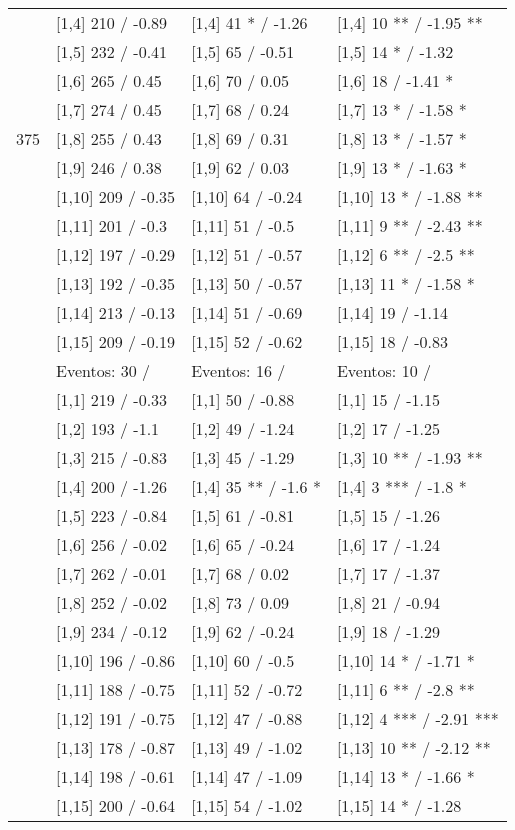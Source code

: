 \begin{table}
\begin{tabular}[t]{llll}
\addlinespace
 & {}[1,4] 210  / -0.89 & {}[1,4] 41 * / -1.26 & {}[1,4] 10 ** / -1.95 **\\
 & {}[1,5] 232  / -0.41 & {}[1,5] 65  / -0.51 & {}[1,5] 14 * / -1.32\\
 & {}[1,6] 265  / 0.45 & {}[1,6] 70  / 0.05 & {}[1,6] 18  / -1.41 *\\
 & {}[1,7] 274  / 0.45 & {}[1,7] 68  / 0.24 & {}[1,7] 13 * / -1.58 *\\
375 & {}[1,8] 255  / 0.43 & {}[1,8] 69  / 0.31 & {}[1,8] 13 * / -1.57 *\\
\addlinespace
 & {}[1,9] 246  / 0.38 & {}[1,9] 62  / 0.03 & {}[1,9] 13 * / -1.63 *\\
 & {}[1,10] 209  / -0.35 & {}[1,10] 64  / -0.24 & {}[1,10] 13 * / -1.88 **\\
 & {}[1,11] 201  / -0.3 & {}[1,11] 51  / -0.5 & {}[1,11] 9 ** / -2.43 **\\
 & {}[1,12] 197  / -0.29 & {}[1,12] 51  / -0.57 & {}[1,12] 6 ** / -2.5 **\\
 & {}[1,13] 192  / -0.35 & {}[1,13] 50  / -0.57 & {}[1,13] 11 * / -1.58 *\\
\addlinespace
 & {}[1,14] 213  / -0.13 & {}[1,14] 51  / -0.69 & {}[1,14] 19  / -1.14\\
 & {}[1,15] 209  / -0.19 & {}[1,15] 52  / -0.62 & {}[1,15] 18  / -0.83\\
 & Eventos:  30 / & Eventos:  16 / & Eventos:  10 /\\
 & {}[1,1] 219  / -0.33 & {}[1,1] 50  / -0.88 & {}[1,1] 15  / -1.15\\
 & {}[1,2] 193  / -1.1 & {}[1,2] 49  / -1.24 & {}[1,2] 17  / -1.25\\
\addlinespace
 & {}[1,3] 215  / -0.83 & {}[1,3] 45  / -1.29 & {}[1,3] 10 ** / -1.93 **\\
 & {}[1,4] 200  / -1.26 & {}[1,4] 35 ** / -1.6 * & {}[1,4] 3 *** / -1.8 *\\
 & {}[1,5] 223  / -0.84 & {}[1,5] 61  / -0.81 & {}[1,5] 15  / -1.26\\
 & {}[1,6] 256  / -0.02 & {}[1,6] 65  / -0.24 & {}[1,6] 17  / -1.24\\
 & {}[1,7] 262  / -0.01 & {}[1,7] 68  / 0.02 & {}[1,7] 17  / -1.37\\
\addlinespace
500 & {}[1,8] 252  / -0.02 & {}[1,8] 73  / 0.09 & {}[1,8] 21  / -0.94\\
 & {}[1,9] 234  / -0.12 & {}[1,9] 62  / -0.24 & {}[1,9] 18  / -1.29\\
 & {}[1,10] 196  / -0.86 & {}[1,10] 60  / -0.5 & {}[1,10] 14 * / -1.71 *\\
 & {}[1,11] 188  / -0.75 & {}[1,11] 52  / -0.72 & {}[1,11] 6 ** / -2.8 **\\
 & {}[1,12] 191  / -0.75 & {}[1,12] 47  / -0.88 & {}[1,12] 4 *** / -2.91 ***\\
\addlinespace
 & {}[1,13] 178  / -0.87 & {}[1,13] 49  / -1.02 & {}[1,13] 10 ** / -2.12 **\\
 & {}[1,14] 198  / -0.61 & {}[1,14] 47  / -1.09 & {}[1,14] 13 * / -1.66 *\\
 & {}[1,15] 200  / -0.64 & {}[1,15] 54  / -1.02 & {}[1,15] 14 * / -1.28\\
\bottomrule
\end{tabular}
\end{table}
